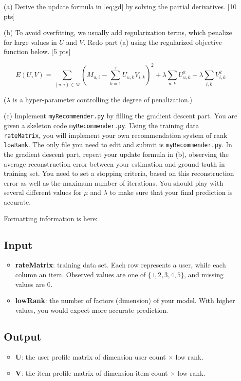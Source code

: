\documentclass[12pt]{article}
\begin{document}
\begin{itemize}
	\item[(a)] Derive the update formula in \eqref{eq:gd} by
solving the partial derivatives. [10 pts]

\item[(b)] To avoid overfitting, we usually add regularization terms, which penalize for large values in $U$ and $V$.
Redo part (a) using the regularized objective function below. [5
pts]

\begin{equation}
E(U,V) = \sum_{(u, i) \in M} (M_{u,i} - \sum_{k=1}^r U_{u,k}
V_{i,k})^2 + \lambda \sum_{u,k} U_{u,k}^2 + \lambda \sum_{i,k}
V_{i,k}^2 \nonumber
\end{equation}

($\lambda$ is a hyper-parameter controlling the degree of
penalization.)

\item[(c)] Implement \texttt{myRecommender.py} by filling the gradient descent part.
You are given a skeleton code \texttt{myRecommender.py}. Using the
training data \texttt{rateMatrix}, you will implement your own
recommendation system of rank \texttt{lowRank}. The only file you
need to edit and submit is \texttt{myRecommender.py}. In the gradient descent
part, repeat your update formula in (b), observing the average
reconstruction error between your estimation and ground truth in
training set. You need to set a stopping criteria, based on this
reconstruction error as well as the maximum number of iterations.
You should play with several different values for $\mu$ and
$\lambda$ to make sure that your final prediction is accurate.

Formatting information is here:

\subsection{Input}
\begin{itemize}
  \item \textbf{rateMatrix}: training data set. Each row represents a user, while each column an item.
  Observed values are one of $\{1,2,3,4,5\}$, and missing values are
  0.
  \item \textbf{lowRank}: the number of factors (dimension) of your
  model. With higher values, you would expect more accurate
  prediction.
\end{itemize}

\subsection{Output}
\begin{itemize}
  \item \textbf{U}: the user profile matrix of dimension user count
  $\times$ low rank.
  \item \textbf{V}: the item profile matrix of dimension item count
  $\times$ low rank.
\end{itemize}


\end{itemize}
\end{document}

